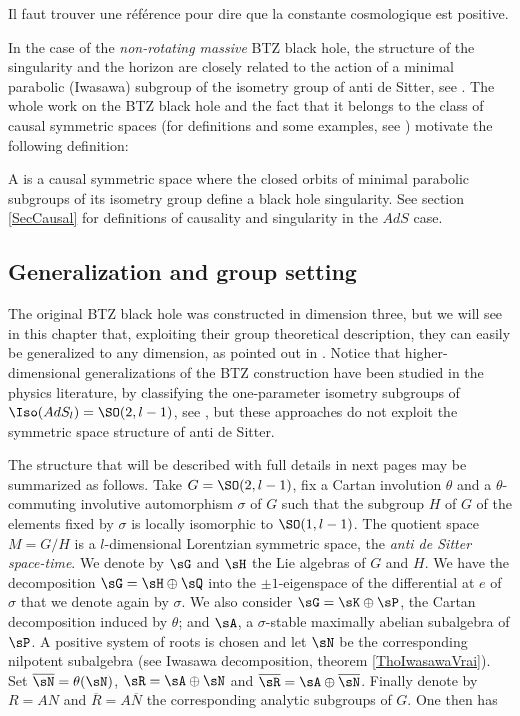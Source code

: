 \begin{probleme}
Il faut trouver une référence pour dire que la constante cosmologique est positive.
\end{probleme}

In the case of the \emph{non-rotating massive} BTZ black hole, the structure of the singularity and the horizon are closely related to the action of a minimal parabolic (Iwasawa) subgroup of the isometry group of anti de Sitter, see \cite{BTZB_deux,Keio}. The whole work on the BTZ black hole and the fact that it belongs to the class of causal symmetric spaces (for definitions and some examples, see \cite{HilgertOlaf}) motivate the following definition:

\begin{definition}
A  is a causal symmetric space where the closed orbits of minimal parabolic subgroups of its isometry group define a black hole singularity. See section \ref{SecCausal} for definitions of causality and singularity in the $AdS$ case.
\label{Def1}
\end{definition}

\subsection{Generalization and group setting}
\label{SubSecGEneBHGrop}


The original BTZ black hole was constructed in dimension three, but we will see in this chapter that, exploiting their group theoretical description, they can easily be generalized to any dimension, as pointed out in \cite{BDRS,lcTNAdS}.  Notice that higher-dimensional generalizations of the BTZ construction have been studied in the physics literature, by classifying the one-parameter isometry subgroups of $\Iso(AdS_l)=\SO(2,l-1)$, see \cite{Figueroa,AdSBH,Madden,BanadosIQxXuEh,Aminneborg,HolstPeldan}, but these approaches do not exploit the symmetric space structure of anti de Sitter.

The structure that will be described with full details in next pages may be summarized as follows. Take $G=\SO(2,l-1)$, fix a Cartan involution $\theta$ and a $\theta$-commuting involutive automorphism $\sigma$ of $G$ such that the subgroup $H$ of $G$ of the elements fixed by $\sigma$ is locally isomorphic to $\SO(1,l-1)$. The quotient space $M=G/H$ is a $l$-dimensional Lorentzian symmetric space, the {\sl anti de Sitter space-time}.  We denote by $\sG$ and $\sH$ the Lie algebras of $G$ and $H$. We have the decomposition $\sG=\sH\oplus\sQ$ into the $\pm 1$-eigenspace  of the differential at $e$ of $\sigma$ that we denote again by $\sigma$.  We also consider $\sG=\sK\oplus\sP$, the Cartan decomposition induced by $\theta$; and $\sA$, a $\sigma$-stable maximally abelian subalgebra of $\sP$. A positive system of roots is chosen  and let $\sN$ be the corresponding nilpotent subalgebra (see Iwasawa decomposition, theorem \ref{ThoIwasawaVrai}).  Set  $\overline{\sN}=\theta(\sN)$, $\sR=\sA\oplus\sN$ and $\overline{\sR}=\sA\oplus\overline{\sN}$. Finally denote by $R=AN$ and $\overline{R}=A\overline{N}$ the corresponding analytic subgroups of $G$.  One then has

